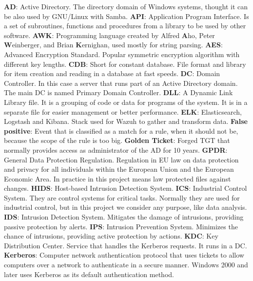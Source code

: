 \textbf{AD}: Active Directory. The directory domain of Windows systems, thought it can be also used by GNU/Linux with Samba.
\linej
\linej
\textbf{API}: Application Program Interface. Is a set of subroutines, functions and procedures from a library to be used by other software.
\linej
\linej
\textbf{AWK}: Programming language created by Alfred \textbf{A}ho, Peter \textbf{W}einberger, and Brian \textbf{K}ernighan, used mostly for string parsing.
\linej
\linej
\textbf{AES}: Advanced Encryption Standard. Popular symmetric encryption algorithm with different key lengths.
\linej
\linej
\textbf{CDB}: Short for constant database. File format and library for item creation and reading in a database at fast speeds.
\linej
\linej
\textbf{DC}: Domain Controller. In this case a server that runs part of an Active Directory domain. The main DC is named Primary Domain Controller.
\linej
\linej
\textbf{DLL}: A Dynamic Link Library file. It is a grouping of code or data for programs of the system. It is in a separate file for easier management or better performance.
\linej
\linej
\textbf{ELK}: Elasticsearch, Logstash and Kibana. Stack used for Wazuh to gather and transform data.
\linej
\linej
\textbf{False positive}: Event that is classified as a match for a rule, when it should not be, because the scope of the rule is too big.
\linej
\linej
\textbf{Golden Ticket}: Forged TGT that normally provides access as administrator of the AD for 10 years.
\linej
\linej
\textbf{GPDR}: General Data Protection Regulation. Regulation in EU law on data protection and privacy for all individuals within the European Union and the European Economic Area. In practice in this project means law protected files against changes.
\linej
\linej
\textbf{HIDS}: Host-based Intrusion Detection System.
\linej
\linej
\textbf{ICS}: Industrial Control System. They are control systems for critical tasks. Normally they are used for industrial control, but in this project we consider any purpose, like data analysis.
\linej
\linej
\textbf{IDS}: Intrusion Detection System. Mitigates the damage of intrusions, providing passive protection by alerts.
\linej
\linej
\textbf{IPS}: Intrusion Prevention System. Minimizes the chance of intrusions, providing active protection by actions.
\linej
\linej
\textbf{KDC}: Key Distribution Center. Service that handles the Kerberos requests. It runs in a DC.
\linej
\linej
\textbf{Kerberos}: Computer network authentication protocol that uses tickets to allow computers over a network to authenticate in a secure manner. Windows 2000 and later uses Kerberos as its default authentication method.
